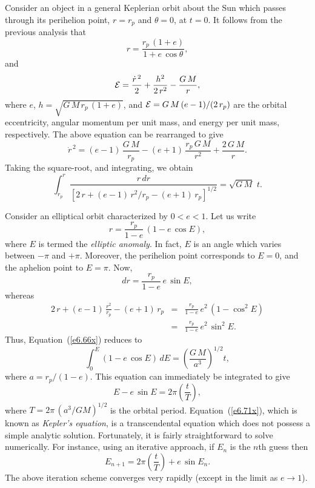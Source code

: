 Consider an object in a general Keplerian orbit about the Sun which
passes through its perihelion point, $r=r_p$ and $\theta=0$, at $t=0$. It
follows from the previous analysis  that
\begin{equation}\label{e6.63x}
r = \frac{r_p\,(1+e)}{1+e\,\cos\theta},
\end{equation}
and
\begin{equation}
{\cal E} = \frac{\dot{r}^{\,2}}{2} + \frac{h^2}{2\,r^2} - \frac{G\,M}{r},
\end{equation}
where $e$, $h = \sqrt{G\,M\,r_p\,(1+e)}$, and ${\cal E} = G\,M\,(e-1)/(2\,r_p)$ are the orbital eccentricity, angular momentum per unit mass, and
energy per unit mass, respectively. The above equation can be rearranged to
give
\begin{equation}
\dot{r}^{\,2} = (e-1)\,\frac{G\,M}{r_p} - (e+1)\,\frac{r_p\,G\,M}{r^2}
+ \frac{2\,G\,M}{r}.
\end{equation}
Taking the square-root, and integrating, we obtain
\begin{equation}\label{e6.66x}
\int_{r_p}^r\frac{r\,dr}{[2\,r + (e-1)\,r^2/r_p - (e+1)\,r_p]^{1/2}} =
\sqrt{G\,M}\,\,t.
\end{equation}

Consider an elliptical orbit characterized by $0<e < 1$. Let us write
\begin{equation}\label{e6.67x}
r = \frac{r_p}{1-e}\,(1-e\,\cos E),
\end{equation}
where $E$ is termed the {\em elliptic anomaly}. In fact, $E$ is an angle which
varies between $-\pi$ and $+\pi$. Moreover, the perihelion point corresponds to
$E=0$, and the aphelion point to $E=\pi$. Now,
\begin{equation}
dr = \frac{r_p}{1-e}\,e\,\sin E,
\end{equation}
whereas
\begin{eqnarray}
2\,r + (e-1)\,\frac{r^2}{r_p}- (e+1)\,r_p &=& \frac{r_p}{1-e}\,e^2\,(1-\cos^2 E)\nonumber\\[0.5ex]
& =& \frac{r_p}{1-e}\,e^2\,\sin^2E.
\end{eqnarray}
Thus, Equation~(\ref{e6.66x}) reduces to
\begin{equation}
\int_0^E (1-e\,\cos E)\,dE = \left(\frac{G\,M}{a^3}\right)^{1/2} t,
\end{equation}
where $a = r_p/(1-e)$. This equation can immediately be integrated to give
\begin{equation}\label{e6.71x}
E - e\,\sin E = 2\pi\left(\frac{t}{T}\right),
\end{equation}
where
$T= 2\pi\,(a^3/GM)^{1/2}$ is the orbital period. Equation~(\ref{e6.71x}),
which  is known as {\em Kepler's equation},  is a transcendental equation 
which does not possess a simple analytic solution. Fortunately, it is fairly  straightforward to
solve numerically. For instance, using an iterative approach,
if $E_n$ is the $n$th guess then
\begin{equation}
E_{n+1} = 2\pi\left(\frac{t}{T}\right) + e\,\sin E_n.
\end{equation}
The above iteration scheme  converges very rapidly (except in the limit
as $e\rightarrow 1$). 


